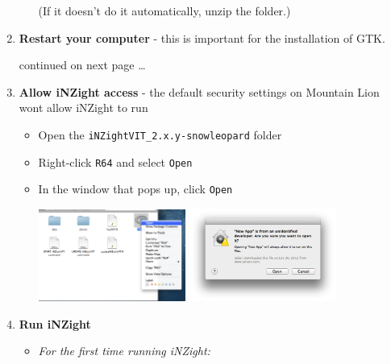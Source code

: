 \documentclass[10pt,a4paper,twoside]{article}
\begin{document}
\begin{enumerate}
\begin{itemize}
    

    (If it doesn't do it automatically, unzip the folder.)
  \end{itemize}

\item \textbf{Restart your computer} - this is important for the installation of GTK.

\vfill
{\flushright continued on next page \ldots}
\pagebreak
\item \textbf{Allow iNZight access} - the default security settings on Mountain Lion wont
  allow iNZight to run

  \begin{itemize}
  \item Open the \verb+iNZightVIT_2.x.y-snowleopard+ folder
  \item Right-click \verb+R64+ and select \verb+Open+
  \item In the window that pops up, click \verb+Open+
    \begin{center}
      \includegraphics[width=0.4\textwidth]{fig/mountain-lion/s2-a.png}
      \includegraphics[width=0.4\textwidth]{fig/open-unknown.png}  %
    \end{center}
  \end{itemize}

\item \textbf{Run iNZight}

  \begin{itemize}
  \item \emph{For the first time running iNZight:}


\end{itemize}
\end{enumerate}
\end{document}

